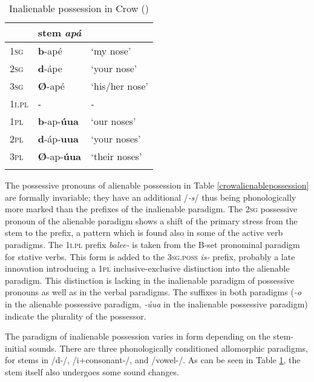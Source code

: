 \documentclass[output=paper]{LSP/langsci}
\begin{document}
\begin{table}
\caption{Inalienable possession in Crow (\citealt[52]{Graczyk2007})} \label{crowinalienablepossession}
\begin{tabular}{ l l l }
\lsptoprule
& stem \textit{apá}  & \\
\midrule	
\textsc{1sg} & \textbf{b}-apé & `my nose' \\
 
\textsc{2sg} & \textbf{d}-ápe	 & `your nose' \\
 
\textsc{3sg} & \textbf{Ø}-apé & `his/her nose' \\
 
\textsc{1i.pl}	& -	& - \\
 
\textsc{1pl} & \textbf{b}-ap-\textbf{úua}	& `our noses' \\
 
\textsc{2pl} & \textbf{d}-áp-\textbf{uua}	& `your noses' \\
 
\textsc{3pl} & \textbf{Ø}-ap-\textbf{úua}	& `their noses' \\
\lspbottomrule
\end{tabular}
\end{table}

The possessive pronouns of alienable possession in Table \ref{crowalienablepossession} are formally invariable; they have an additional /\textit{-s}/ thus being phonologically more marked than the prefixes of the inalienable paradigm. The \textsc{2sg} possessive pronoun of the alienable paradigm shows a shift of the primary stress from the stem to the prefix, a pattern which is found also in some of the active verb paradigms. The \textsc{1i.pl} prefix \textit{balee-} is taken from the B-set pronominal paradigm for stative verbs. This form is added to the \textsc{3sg.poss} \textit{is-} prefix, probably a late innovation introducing a \textsc{1pl} inclusive-exclusive distinction into the alienable paradigm. This distinction is lacking in the inalienable paradigm of possessive pronouns as well as in the verbal paradigms. The suffixes in both paradigms (\textit{-o} in the alienable possessive paradigm, \textit{-úua} in the inalienable possessive paradigm) indicate the plurality of the possessor.

The paradigm of inalienable possession varies in form depending on the stem-initial sounds. There are three phonologically conditioned allomorphic paradigms, for stems in /d-/, /i+consonant-/, and /vowel-/. As can be seen in Table \ref{crowinalienablepossession}, the stem itself also undergoes some sound changes.
\end{document}
